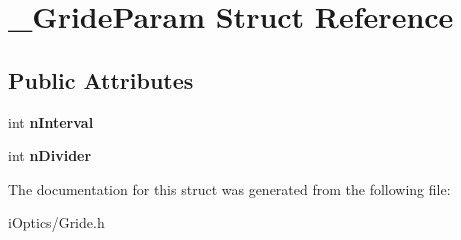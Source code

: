 \hypertarget{struct___gride_param}{}\section{\+\_\+\+Gride\+Param Struct Reference}
\label{struct___gride_param}
\subsection*{Public Attributes}
\begin{DoxyCompactItemize}
\item 
\mbox{\label{struct___gride_param_a54db6ff69ed97260c3e5f65e63a8c517}} 
int {\bfseries n\+Interval}
\item 
\mbox{\label{struct___gride_param_a6de4db533b739d137bd0907050d2991e}} 
int {\bfseries n\+Divider}
\end{DoxyCompactItemize}


The documentation for this struct was generated from the following file\+:\begin{DoxyCompactItemize}
\item 
i\+Optics/Gride.\+h\end{DoxyCompactItemize}
